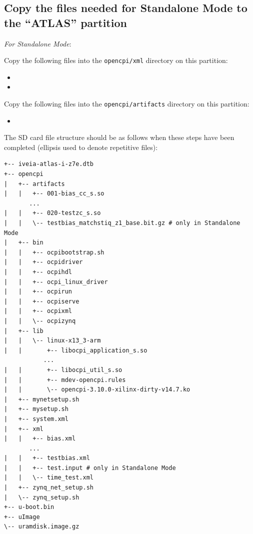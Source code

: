 \subsection*{Copy the files needed for Standalone Mode to the ``ATLAS'' partition}
\textit{For Standalone Mode}:
\begin{itemize}
\begin{minipage}{\linewidth}
 \item Copy the following files into the \texttt{opencpi/xml} directory on this partition:
 \begin{itemize}
   \item {}
   \item {}
 \end{itemize}
 \item Copy the following files into the \texttt{opencpi/artifacts} directory on this partition:
 \begin{itemize}
   \item {}
 \end{itemize}
\end{minipage}
\end{itemize}

\newpage
\begin{flushleft}
The SD card file structure should be as follows when these steps have been completed (ellipsis used to denote repetitive files):
\end{flushleft}
\begin{verbatim}
+-- iveia-atlas-i-z7e.dtb
+-- opencpi
|   +-- artifacts
|   |   +-- 001-bias_cc_s.so
       ...
|   |   +-- 020-testzc_s.so
|   |   \-- testbias_matchstiq_z1_base.bit.gz # only in Standalone Mode
|   +-- bin
|   |   +-- ocpibootstrap.sh
|   |   +-- ocpidriver
|   |   +-- ocpihdl
|   |   +-- ocpi_linux_driver
|   |   +-- ocpirun
|   |   +-- ocpiserve
|   |   +-- ocpixml
|   |   \-- ocpizynq
|   +-- lib
|   |   \-- linux-x13_3-arm
|   |       +-- libocpi_application_s.so
           ...
|   |       +-- libocpi_util_s.so
|   |       +-- mdev-opencpi.rules
|   |       \-- opencpi-3.10.0-xilinx-dirty-v14.7.ko
|   +-- mynetsetup.sh
|   +-- mysetup.sh
|   +-- system.xml
|   +-- xml
|   |   +-- bias.xml
       ...
|   |   +-- testbias.xml
|   |   +-- test.input # only in Standalone Mode
|   |   \-- time_test.xml
|   +-- zynq_net_setup.sh
|   \-- zynq_setup.sh
+-- u-boot.bin
+-- uImage
\-- uramdisk.image.gz
\end{verbatim}
